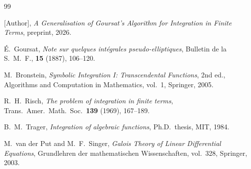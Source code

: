 \documentclass[11pt,a4paper]{article}
\theoremstyle{plain}
\theoremstyle{definition}
\theoremstyle{remark}
\begin{document}
\begin{thebibliography}{99}

[Author], \emph{A Generalisation of Goursat's Algorithm for Integration in Finite Terms}, preprint, 2026.

\'E.~Goursat,
\emph{Note sur quelques int\'egrales pseudo-elliptiques},
Bulletin de la S.~M.~F., \textbf{15} (1887), 106--120.

M.~Bronstein,
\emph{Symbolic Integration I: Transcendental Functions},
2nd ed., Algorithms and Computation in Mathematics, vol.~1, Springer, 2005.

R.~H.~Risch,
\emph{The problem of integration in finite terms},
Trans.\ Amer.\ Math.\ Soc.\ \textbf{139} (1969), 167--189.

B.~M.~Trager,
\emph{Integration of algebraic functions},
Ph.D.\ thesis, MIT, 1984.

M.~van der Put and M.~F.~Singer,
\emph{Galois Theory of Linear Differential Equations},
Grundlehren der mathematischen Wissenschaften, vol.~328, Springer, 2003.

\end{thebibliography}
\end{document}
